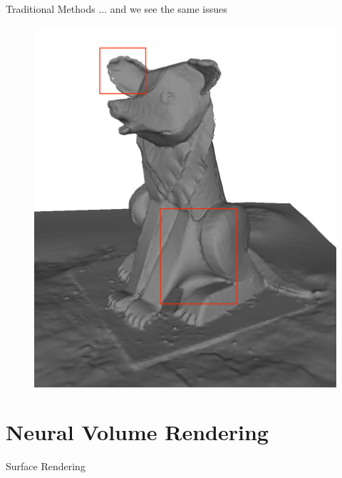 \documentclass[10pt]{beamer}
\begin{document}
\begin{frame}{Traditional Methods}  
    ... and we see the same issues
    \begin{figure}
        \centering
        \includegraphics[width=0.5\linewidth]{figures/intro/psr_issues.png}
    \end{figure}
\end{frame}

\section{Neural Volume Rendering}

{
\begin{frame}{Surface Rendering}
    \begin{figure}
        \centering
        \hspace{3em}
    \end{figure}
\end{frame}
}
\end{document}

